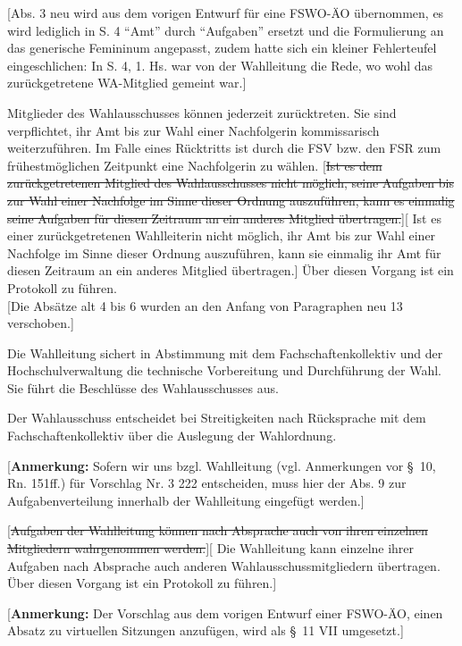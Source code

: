 \documentclass[%
draft,%
multilinesections%
]{fswo}
\newcommand\oldT[1]  {{\color{Gray}[\st{#1}]}}
\newcommand\newT[1]  {{\color{Green}[#1]}}
\newcommand\bemFr[1] {{\color{Red}[#1]}}
\newcommand\bemFe[1] {{\color{Cyan}[#1]}}
\newcommand\oldT[1]{}%
\newcommand\newT[1]{#1}
\newcommand\bemFr[1]{}%
\newcommand\bemFe[1]{}%
\newcommand\change[2]{\oldT{#1}\newT{#2}}
\begin{document}
\begin{contract}
\begin{addmargin}{1cm}
\bemFr{Abs. 3 neu wird aus dem vorigen Entwurf für eine FSWO-ÄO übernommen, es wird lediglich in S. 4 \enquote{Amt} durch \enquote{Aufgaben} ersetzt und die Formulierung an das generische Femininum angepasst,
zudem hatte sich ein kleiner Fehlerteufel eingeschlichen:
In S. 4, 1. Hs. war von der Wahlleitung die Rede, wo wohl das zurückgetretene WA-Mitglied gemeint war.}
\end{addmargin}

Mitglieder des Wahlausschusses können jederzeit zurücktreten.
Sie sind verpflichtet, ihr Amt bis zur Wahl einer Nachfolgerin kommissarisch weiterzuführen.
Im Falle eines Rücktritts ist durch die FSV bzw. den FSR zum frühestmöglichen Zeitpunkt eine Nachfolgerin zu wählen.
\change{Ist es dem zurückgetretenen Mitglied des Wahlausschusses nicht möglich, seine Aufgaben bis zur Wahl einer Nachfolge im Sinne dieser Ordnung auszuführen, kann es einmalig seine Aufgaben für diesen Zeitraum an ein anderes Mitglied übertragen.}{%
Ist es einer zurückgetretenen Wahlleiterin nicht möglich, ihr Amt bis zur Wahl einer
Nachfolge im Sinne dieser Ordnung auszuführen, kann sie einmalig ihr Amt für diesen
Zeitraum an ein anderes Mitglied übertragen.}
Über diesen Vorgang ist ein Protokoll zu führen.
%
\\\bemFe{Die Absätze alt 4 bis 6 wurden an den Anfang von Paragraphen neu 13 verschoben.}

Die Wahlleitung sichert in Abstimmung mit dem Fachschaftenkollektiv und der Hochschulverwaltung die technische Vorbereitung und Durchführung der Wahl.
Sie führt die Beschlüsse des Wahlausschusses aus.

Der Wahlausschuss entscheidet bei Streitigkeiten nach Rücksprache mit dem Fachschaftenkollektiv über die Auslegung der Wahlordnung.
%
\begin{addmargin}{1cm}
\bemFr{\textbf{Anmerkung:} Sofern wir uns bzgl. Wahlleitung (vgl. Anmerkungen vor \S~10, Rn. 151ff.) für Vorschlag Nr. 3
222 entscheiden, muss hier der Abs. 9 zur Aufgabenverteilung innerhalb der Wahlleitung eingefügt werden.}
\end{addmargin}

\change{Aufgaben der Wahlleitung können nach Absprache auch von ihren einzelnen Mitgliedern wahrgenommen werden.}{%
Die Wahlleitung kann einzelne ihrer Aufgaben nach Absprache auch anderen Wahlausschussmitgliedern übertragen. Über diesen Vorgang ist ein Protokoll zu führen.}
%
\begin{addmargin}{1cm}
\bemFr{\textbf{Anmerkung:} Der Vorschlag aus dem vorigen Entwurf einer FSWO-ÄO, einen Absatz zu virtuellen Sitzungen anzufügen, wird als \S~11 VII umgesetzt.}
\end{addmargin}
\end{contract}
\end{document}

